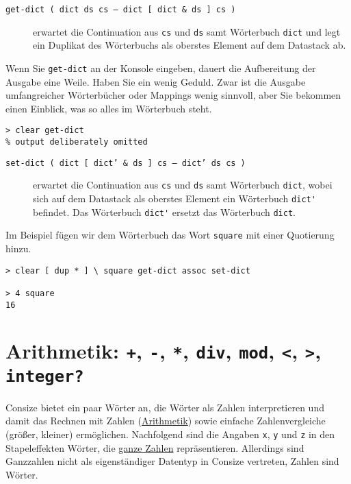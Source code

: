\begin{description}
\item[\texttt{get-dict ( dict ds cs -- dict [ dict \& ds ] cs )}] erwartet die Continuation aus \verb|cs| und \verb|ds| samt Wörterbuch \verb|dict| und legt ein Duplikat des Wörterbuchs als oberstes Element auf dem Datastack ab.
\end{description}

Wenn Sie \verb|get-dict| an der Konsole eingeben, dauert die Aufbereitung der Ausgabe eine Weile. Haben Sie ein wenig Geduld. Zwar ist die Ausgabe umfangreicher Wörterbücher oder Mappings wenig sinnvoll, aber Sie bekommen einen Einblick, was so alles im Wörterbuch steht.

\begin{verbatim}
> clear get-dict
% output deliberately omitted
\end{verbatim}

\begin{description}
\item[\texttt{set-dict ( dict [ dict' \& ds ] cs -- dict' ds cs )}] 
erwartet die Continuation aus \verb|cs| und \verb|ds| samt Wörterbuch \verb|dict|, wobei sich auf dem Datastack als oberstes Element ein Wörterbuch \verb|dict'| befindet. Das Wörterbuch \verb|dict'| ersetzt das Wörterbuch \verb|dict|.
\end{description}

Im Beispiel fügen wir dem Wörterbuch das Wort \verb|square| mit einer Quotierung hinzu.

\begin{verbatim}
> clear [ dup * ] \ square get-dict assoc set-dict

> 4 square
16
\end{verbatim}

\section{Arithmetik: \texttt{+}, \texttt{-}, \texttt{*}, \texttt{div}, \texttt{mod}, \texttt{<}, \texttt{>}, \texttt{integer?}}

Consize bietet ein paar Wörter an, die Wörter als Zahlen interpretieren und damit das Rechnen mit Zahlen (\href{http://de.wikipedia.org/wiki/Arithmetik}{Arithmetik}) sowie einfache Zahlenvergleiche (größer, kleiner) ermöglichen. Nachfolgend sind die Angaben \verb|x|, \verb|y| und \verb|z| in den Stapeleffekten Wörter, die \href{http://de.wikipedia.org/wiki/Ganze\_Zahlen}{ganze Zahlen} repräsentieren. Allerdings sind Ganzzahlen nicht als eigenständiger Datentyp in Consize vertreten, Zahlen sind Wörter.

